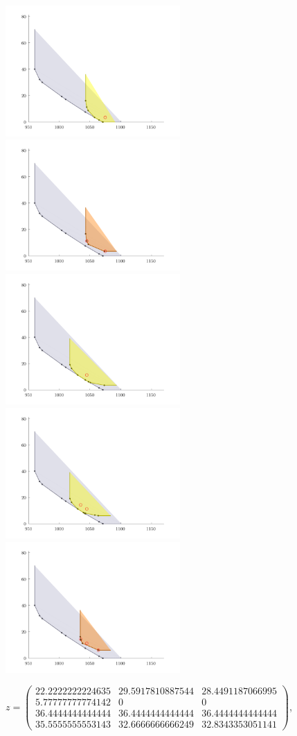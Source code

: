 \includegraphics[width=0.5\textwidth]{plot6.pdf} 
\includegraphics[width=0.5\textwidth]{plot7.pdf} 
\includegraphics[width=0.5\textwidth]{plot8.pdf} 
\includegraphics[width=0.5\textwidth]{plot9.pdf} 
\includegraphics[width=0.5\textwidth]{plot10.pdf} 
\begin{sloppypar}

${z=\begin{pmatrix}
22.2222222224635&29.5917810887544&28.4491187066995\\
5.77777777774142&0&0\\
36.4444444444444&36.4444444444444&36.4444444444444\\
35.5555555553143&32.6666666666249&32.8343353051141
\end{pmatrix}
}$, 
\end{sloppypar}

